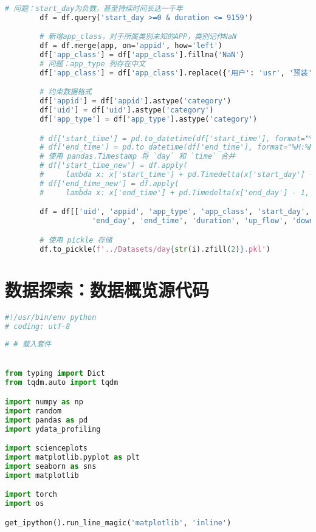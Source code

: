 \documentclass[withoutpreface,bwprint]{cumcmthesis}
\begin{document}
\begin{appendices}
\begin{lstlisting}[language=Python]
        # 问题：start_day为负数，甚至持续时间长达一千年
        df = df.query('start_day >=0 & duration <= 9159')

        # 新增app_class，对于所属类别未知的APP，类别记作NaN
        df = df.merge(app, on='appid', how='left')
        df['app_class'] = df['app_class'].fillna('NaN')
        # 问题：app_type 列存在中文
        df['app_class'] = df['app_class'].replace({'用户': 'usr', '预装': 'sys'})

        # 约束数据格式
        df['appid'] = df['appid'].astype('category')
        df['uid'] = df['uid'].astype('category')
        df['app_type'] = df['app_type'].astype('category')

        # df['start_time'] = pd.to_datetime(df['start_time'], format="%H:%M:%S")
        # df['end_time'] = pd.to_datetime(df['end_time'], format="%H:%M:%S")
        # 使用 pandas.Timestamp 将 `day` 和 `time` 合并
        # df['start_time_new'] = df.apply(
        #     lambda x: x['start_time'] + pd.Timedelta(x['start_day'] - 1, unit='D'), axis=1)
        # df['end_time_new'] = df.apply(
        #     lambda x: x['end_time'] + pd.Timedelta(x['end_day'] - 1, unit='D'), axis=1)

        df = df[['uid', 'appid', 'app_type', 'app_class', 'start_day', 'start_time',
                    'end_day', 'end_time', 'duration', 'up_flow', 'down_flow']]

        # 使用 pickle 存储
        df.to_pickle(f'../Datasets/day{str(i).zfill(2)}.pkl')

    \end{lstlisting}

    \section{数据探索：数据概览源代码}

    \begin{lstlisting}[language=Python]
#!/usr/bin/env python
# coding: utf-8
      
# # 载入套件


from typing import Dict
from tqdm.auto import tqdm

import numpy as np
import random
import pandas as pd
import ydata_profiling

import scienceplots
import matplotlib.pyplot as plt
import seaborn as sns
import matplotlib

import torch
import os

get_ipython().run_line_magic('matplotlib', 'inline')


\end{lstlisting}
\end{appendices}
\end{document}
